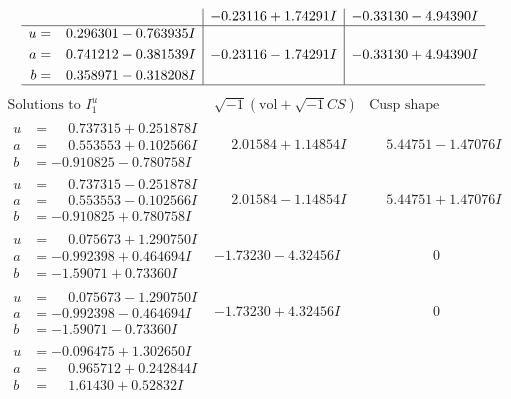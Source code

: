 \documentclass[1p]{elsarticle_modified}
\theoremstyle{definition}
\newcommand{\I}{\sqrt{-1}}
\begin{document}
$$\begin{array}{c|c|c}
 & -0.23116 + 1.74291 I & -0.33130 - 4.94390 I \\ \hline\begin{aligned}
u &= \phantom{-}0.296301 - 0.763935 I \\
a &= \phantom{-}0.741212 - 0.381539 I \\
b &= \phantom{-}0.358971 - 0.318208 I\end{aligned}
 & -0.23116 - 1.74291 I & -0.33130 + 4.94390 I\\
 \hline 
 \end{array}$$\newpage$$\begin{array}{c|c|c}  
\text{Solutions to }I^u_{1}& \I (\text{vol} + \sqrt{-1}CS) & \text{Cusp shape}\\
 \hline 
\begin{aligned}
u &= \phantom{-}0.737315 + 0.251878 I \\
a &= \phantom{-}0.553553 + 0.102566 I \\
b &= -0.910825 - 0.780758 I\end{aligned}
 & \phantom{-}2.01584 + 1.14854 I & \phantom{-}5.44751 - 1.47076 I \\ \hline\begin{aligned}
u &= \phantom{-}0.737315 - 0.251878 I \\
a &= \phantom{-}0.553553 - 0.102566 I \\
b &= -0.910825 + 0.780758 I\end{aligned}
 & \phantom{-}2.01584 - 1.14854 I & \phantom{-}5.44751 + 1.47076 I \\ \hline\begin{aligned}
u &= \phantom{-}0.075673 + 1.290750 I \\
a &= -0.992398 + 0.464694 I \\
b &= -1.59071 + 0.73360 I\end{aligned}
 & -1.73230 - 4.32456 I & \phantom{-0.000000 } 0 \\ \hline\begin{aligned}
u &= \phantom{-}0.075673 - 1.290750 I \\
a &= -0.992398 - 0.464694 I \\
b &= -1.59071 - 0.73360 I\end{aligned}
 & -1.73230 + 4.32456 I & \phantom{-0.000000 } 0 \\ \hline\begin{aligned}
u &= -0.096475 + 1.302650 I \\
a &= \phantom{-}0.965712 + 0.242844 I \\
b &= \phantom{-}1.61430 + 0.52832 I\end{aligned}

\end{array}$$
\end{document}
